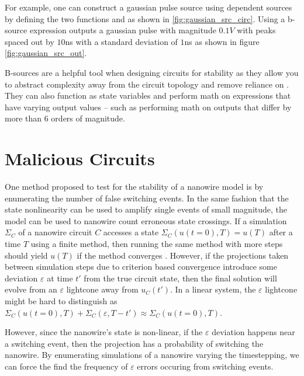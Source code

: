 For example, one can construct a gaussian pulse source using dependent sources
by defining the two functions  and  as shown in 
\ref{fig:gaussian_src_circ}.
Using a b-source expression 
outputs a gaussian pulse with magnitude $0.1V$ with peaks
spaced out by $10$ns with a standard deviation of $1$ns as shown in figure
\ref{fig:gaussian_src_out}. 

B-sources are a helpful tool when designing circuits for stability as they
allow you to abstract complexity away from the circuit topology and remove 
reliance on . They can also function as state variables and perform
math on expressions that have varying output values -- such as performing math
on outputs that differ by more than 6 orders of magnitude. 

\section{Malicious Circuits} \label{malicious_circuits}

One method proposed to test for the stability of a nanowire model is by enumerating
the number of false switching events. In the same fashion that the state nonlinearity
can be used to amplify single events of small magnitude, the model can be used to 
nanowire count erroneous state crossings. If a simulation $\Sigma_C$
of a nanowire circuit $C$ accesses a state $\Sigma_C( u(t=0), T ) = u(T)$ after
a time $T$ using a finite method,
then running the same method with more steps should yield $u(T)$ if the method
converges \cite{DAHLQUIST}.
However, if the projections taken between simulation steps due to criterion 
based convergence introduce some deviation $\varepsilon$ at time $t'$ from the 
true circuit state, then the final solution will evolve from an $\varepsilon$ lightcone
away from $u_C(t')$. In a linear system, the $\varepsilon$ lightcone might be hard to
distinguish as $\Sigma_C(u(t=0), T) + \Sigma_C(\varepsilon, T-t') \approx \Sigma_C(u(t=0), T)$. 

However, since the nanowire's state is non-linear, if the $\varepsilon$ deviation happens
near a switching event, then the projection has a probability of switching the 
nanowire. By enumerating simulations of a nanowire varying the timestepping,
we can force the find the frequency of $\varepsilon$ errors occuring from switching
events.

